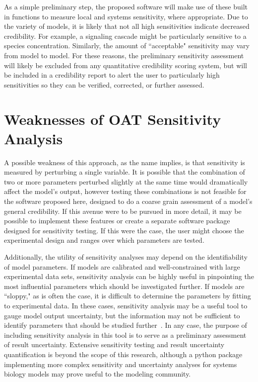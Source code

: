 \documentclass[12pt]{report}
\begin{document}
As a simple preliminary step, the proposed software will make use of these built in functions to measure local and systems sensitivity, where appropriate. Due to the variety of models, it is likely that not all high sensitivities indicate decreased credibility. For example, a signaling cascade might be particularly sensitive to a species concentration.  Similarly, the amount of ``acceptable" sensitivity may vary from model to model. For these reasons, the preliminary sensitivity assessment will likely be excluded from any quantitative credibility scoring system, but will be included in a credibility report to alert the user to particularly high sensitivities so they can be verified, corrected, or further assessed.

\section{Weaknesses of OAT Sensitivity Analysis}

A possible weakness of this approach, as the name implies, is that sensitivity is measured by perturbing a single variable. It is possible that the combination of two or more parameters perturbed slightly at the same time would dramatically affect the model's output, however testing these combinations is not feasible for the software proposed here, designed to do a coarse grain assessment of a model's general credibility. If this avenue were to be pursued in more detail, it may be possible to implement these features or create a separate software package designed for sensitivity testing. If this were the case, the user might choose the experimental design and ranges over which parameters are tested. 

Additionally, the utility of sensitivity analyses may depend on the identifiability of model parameters. If models are calibrated and well-constrained with large experimental data sets, sensitivity analysis can be highly useful in pinpointing the most influential parameters which should be investigated further. If models are ``sloppy," as is often the case, it is difficult to determine the parameters by fitting to experimental data. In these cases, sensitivity analysis may be a useful tool to gauge model output uncertainty, but the information may not be sufficient to identify parameters that should be studied further~\cite{Zi2011}. In any case, the purpose of including sensitivity analysis in this tool is to serve as a preliminary assessment of result uncertainty. Extensive sensitivity testing and result uncertainty quantification is beyond the scope of this research, although a python package implementing more complex sensitivity and uncertainty analyses for systems biology models may prove useful to the modeling community.
\end{document}
